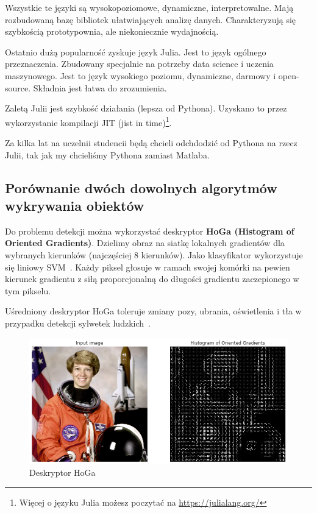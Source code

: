 \documentclass[wi]{zut}
\begin{document}
Wszystkie te języki są wysokopoziomowe, dynamiczne, interpretowalne. Mają rozbudowaną bazę bibliotek ułatwiających analizę danych. Charakteryzują się szybkością prototypownia, ale niekoniecznie wydajnością.

Ostatnio dużą popularność zyskuje język Julia. Jest to język ogólnego przeznaczenia. Zbudowany specjalnie na potrzeby data science i uczenia maszynowego. Jest to język wysokiego poziomu, dynamiczne, darmowy i open-source. Składnia jest łatwa do zrozumienia. 

Zaletą Julii jest szybkość działania (lepsza od Pythona). Uzyskano to przez wykorzystanie kompilacji JIT (jist in time)\footnote{Więcej o języku Julia możesz poczytać na \url{https://julialang.org/}}. 

Za kilka lat na uczelnii studencii będą chcieli odchdodzić od Pythona na rzecz Julii, tak jak my chcieliśmy Pythona zamiast Matlaba.


\subsection{Porównanie dwóch dowolnych algorytmów wykrywania obiektów}

Do problemu detekcji można wykorzystać deskryptor \textbf{HoGa (Histogram of Oriented Gradients)}. Dzielimy obraz na siatkę lokalnych gradientów dla wybranych kierunków (najczęściej 8 kierunków). Jako klasyfikator wykorzystuje się liniowy SVM~\cite{ForczmanskiCV}. Każdy piksel głosuje w ramach swojej komórki na pewien kierunek gradientu z siłą proporcjonalną do długości gradientu zaczepionego w tym pikselu.

Uśredniony deskryptor HoGa toleruje zmiany pozy, ubrania, oświetlenia i tła w przypadku detekcji sylwetek ludzkich~\cite{ForczmanskiCV}.

\begin{figure}[H]
    \centering
    \includegraphics[width=0.7\linewidth]{images/hog-vis.png}
    \caption{Deskryptor HoGa}
    \label{fig:pdgd}
\end{figure}
\end{document}
